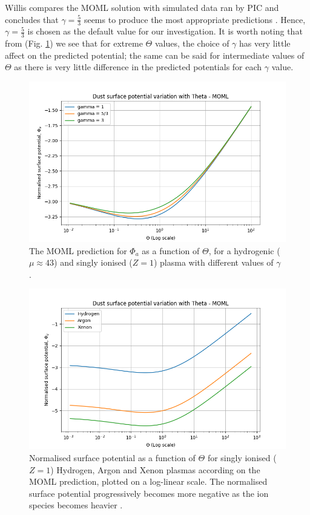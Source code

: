 \documentclass{article}
\begin{document}
Willis compares the MOML solution with simulated data ran by PIC and concludes that 
$\gamma = \frac{5}{3}$ seems to produce the most appropriate predictions \cite{Willis}. 
Hence, $\gamma = \frac{5}{3}$ is chosen as the default value for our investigation. It is worth noting
that from (Fig. \ref{MOMLgamma}) we see that for extreme $\Theta$ values, 
the choice of $\gamma$ has very little affect on the predicted potential; the same can be said for 
intermediate values of $\Theta$ as there is very little difference in the predicted potentials for 
each $\gamma$ value. 

\begin{figure}[H]
\centering
\includegraphics[width=\linewidth]{Output/MOMLgamma.jpeg}
\caption{The MOML prediction for  $\Phi_a$ as a function of $\Theta$, for a hydrogenic ($\mu \approx 43$) and singly ionised ($Z = 1$) plasma with different values of $\gamma$ \cite{Thomas}.}
\label{MOMLgamma} 
\end{figure}


\begin{figure}[H]
\centering
\includegraphics[width=\linewidth]{Output/MOMLgraph.jpeg}
\caption{Normalised surface potential as a function of $\Theta$ for singly ionised ($Z = 1$) Hydrogen, Argon and Xenon plasmas according on the MOML prediction, plotted on a log-linear scale. The normalised surface potential progressively becomes more negative as the ion species becomes heavier \cite{Thomas}.}
\label{MOMLgraph} 
\end{figure}
    
\end{document}
